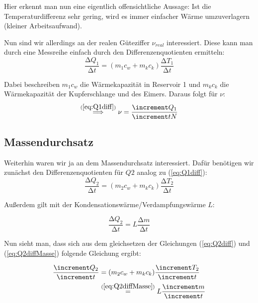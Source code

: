 Hier erkennt man nun eine eigentlich offensichtliche Aussage:
Ist die Temperaturdifferenz sehr gering, wird es immer einfacher Wärme umzuverlagern (kleiner Arbeitsaufwand).

Nun sind wir allerdings an der realen Güteziffer $\nu_{real}$ interessiert.
Diese kann man durch eine Messreihe einfach durch den Differenzenquotienten ermitteln:
\begin{equation} \label{eq:Q1diff}
    \frac{\increment Q_{1}}{\increment t} = (m_{1} c_{w} + m_{k} c_{k}) \frac{\increment T_{1}}{\increment t}
\end{equation}

Dabei beschreiben $m_{1} c_{w}$ die Wärmekapazität in Reservoir 1 und $m_{k} c_{k}$ die Wärmekapazität der Kupferschlange und des Eimers.
Daraus folgt für $\nu$:
\begin{equation}
    \stackrel{(\ref{eq:Q1diff})}{\implies} \nu = \frac{\increment Q_{1}}{\increment t N}
\end{equation}

\subsection{Massendurchsatz}

Weiterhin waren wir ja an dem Massendurchsatz interessiert. Dafür benötigen wir zunächst den Differenzenquotienten für $Q{2}$ analog zu (\ref{eq:Q1diff}):
\begin{equation} \label{eq:Q2diff}
    \frac{\increment Q_{2}}{\increment t} = (m_{2} c_{w} + m_{k} c_{k}) \frac{\increment T_{2}}{\increment t}
\end{equation}

Außerdem gilt mit der Kondensationswärme/Verdampfungswärme $L$:

\begin{equation} \label{eq:Q2diffMasse}
    \frac{\increment Q_{2}}{\increment t} = L \frac{\increment m}{\increment t}
\end{equation}

Nun sieht man, dass sich aus dem gleichsetzen der Gleichungen (\ref{eq:Q2diff}) und (\ref{eq:Q2diffMasse}) folgende Gleichung ergibt:

\begin{align}
    \begin{split}
        \frac{\increment Q_{2}}{\increment t} & = (m_{2} c_{w} + m_{k} c_{k}) \frac{\increment T_{2}}{\increment t} \\
            & \stackrel{(\ref{eq:Q2diffMasse})}{=} L \frac{\increment m}{\increment t}
    \end{split}
\end{align}

